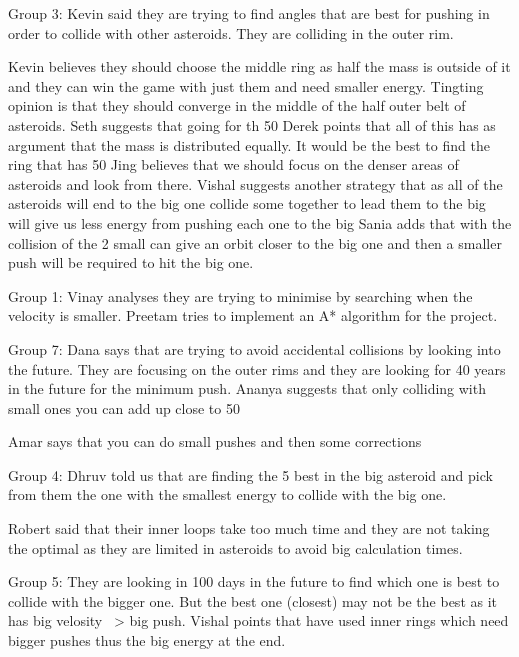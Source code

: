 Group 3:
Kevin said they are trying to find angles that are best for pushing in order to collide with other asteroids. They are colliding in the outer rim.

Kevin believes they should choose the middle ring as half the mass is outside of it and they can win the game with just them and need smaller energy.
Tingting opinion is that they should converge in the middle of the half outer belt of asteroids.
Seth suggests that going for th 50%
Derek points that all of this has as argument that the mass is distributed equally. It would be the best to find the ring that has 50%
Jing believes that we should focus on the denser areas of asteroids and look from there.
Vishal suggests another strategy that as all of the asteroids will end to the big one collide some together to lead them to the big will give us less energy from pushing each one to the big
Sania adds that with the collision of the 2 small can give an orbit closer to the big one and then a smaller push will be required to hit the big one.

Group 1:
Vinay analyses they are trying to minimise by searching when the velocity is smaller.
Preetam tries to implement an A* algorithm for the project.

Group 7:
Dana says that are trying to avoid accidental collisions by looking into the future.
They are focusing on the outer rims and they are looking for 40 years in the future for the minimum push.
Ananya suggests that only colliding with small ones you can add up close to 50%

Amar says that you can do small pushes and then some corrections


Group 4:
Dhruv told us that are finding the 5 best in the big asteroid and pick from them the one with the smallest energy to collide with the big one.

Robert said that their inner loops take too much time and they are not taking the optimal as they are limited in asteroids to avoid big calculation times.

Group 5:
They are looking in 100 days in the future to find which one is best to collide with the bigger one. But the best one (closest) may not be the best as it has big velosity ~> big push. 
Vishal points that have used inner rings which need bigger pushes thus the big energy at the end.

